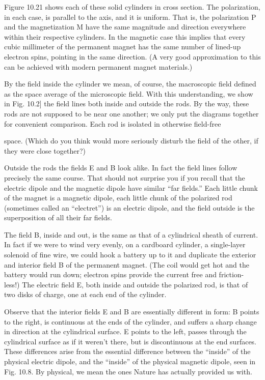 {Figure 10.21 shows each of these solid cylinders in cross section.
The polarization, in each case, is parallel to the axis, and it is 
uniform. That is, the polarization P and the magnetization M have the
same magnitude and direction everywhere within their respective
cylinders. In the magnetic case this implies that every cubic millimeter
of the permanent magnet has the same number of lined-up
electron spins, pointing in the same direction. (A very good approximation
to this can be achieved with modern permanent magnet
materials.)

By the field inside the cylinder we mean, of course, the macroscopic
field defined as the space average of the microscopic field.
With this understanding, we show in Fig. 10.2] the field lines both
inside and outside the rods. By the way, these rods are not supposed
to be near one another; we only put the diagrams together for convenient
comparison. Each rod is isolated in otherwise field-free

space. (Which do you think would more seriously disturb the field
of the other, if they were close together?)

Outside the rods the fields E and B look alike. In fact the field
lines follow precisely the same course. That should not surprise
you if you recall that the electric dipole and the magnetic dipole have
similar ``far fields.'' Each little chunk of the magnet is a magnetic
dipole, each little chunk of the polarized rod (sometimes called an
``electret'') is an electric dipole, and the field outside is the superposition
of all their far fields.

The field B, inside and out, is the same as that of a cylindrical
sheath of current. In fact if we were to wind very evenly, on a cardboard
cylinder, a single-layer solenoid of fine wire, we could hook
a battery up to it and duplicate the exterior and interior field B of
the permanent magnet. (The coil would get hot and the battery
would run down; electron spins provide the current free and friction-
less!) The electric field E, both inside and outside the polarized rod,
is that of two disks of charge, one at each end of the cylinder.

Observe that the interior fields E and B are essentially different
in form: B points to the right, is continuous at the ends of the
cylinder, and suffers a sharp change in direction at the cylindrical
surface. E points to the left, passes through the cylindrical surface
as if it weren't there, but is discontinuous at the end surfaces. These
differences arise from the essential difference between the ``inside''
of the physical electric dipole, and the ``inside'' of the physical magnetic
dipole, seen in Fig. 10.8. By physical, we mean the ones
Nature has actually provided us with.

}
